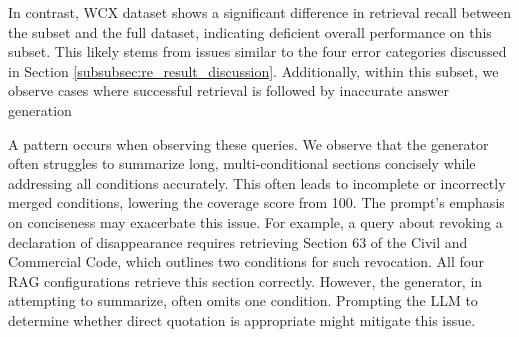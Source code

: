 
In contrast, WCX dataset shows a significant difference in retrieval recall between the subset and the full dataset, indicating deficient overall performance on this subset. This likely stems from issues similar to the four error categories discussed in Section \ref{subsubsec:re_result_discussion}. Additionally, within this subset, we observe cases where successful retrieval is followed by inaccurate answer generation

A pattern occurs when observing these queries. We observe that the generator often struggles to summarize long, multi-conditional sections concisely while addressing all conditions accurately. This often leads to incomplete or incorrectly merged conditions, lowering the coverage score from 100. The prompt's emphasis on conciseness may exacerbate this issue. For example, a query about revoking a declaration of disappearance requires retrieving Section 63 of the Civil and Commercial Code, which outlines two conditions for such revocation. All four RAG configurations retrieve this section correctly. However, the generator, in attempting to summarize, often omits one condition. Prompting the LLM to determine whether direct quotation is appropriate might mitigate this issue.

